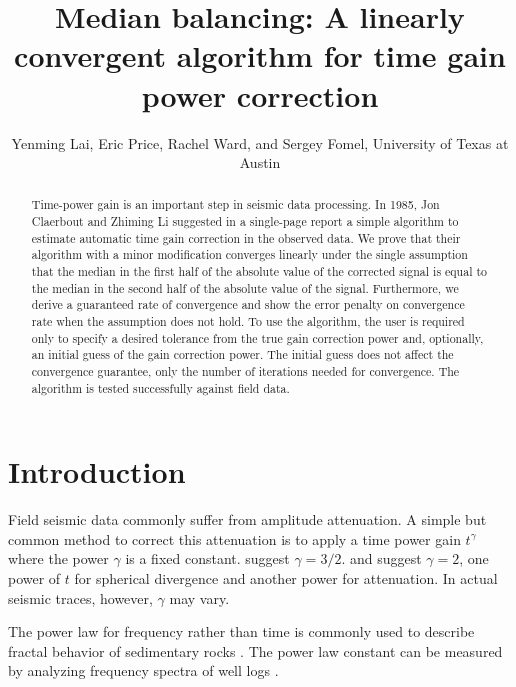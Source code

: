 \documentclass{segabs}
\begin{document}
\title{Median balancing: A linearly convergent algorithm for time gain power correction }

\renewcommand{\thefootnote}{\fnsymbol{footnote}} 

\author{Yenming Lai\footnotemark[1], Eric Price, Rachel Ward, 
  and Sergey Fomel, University of Texas at Austin}


\maketitle

\begin{abstract}
Time-power gain is an important step in seismic data processing. In 1985, Jon Claerbout and Zhiming Li suggested in a single-page report a simple algorithm to estimate automatic time gain correction in the observed data. We prove that their algorithm with a minor modification converges linearly under the single assumption that the median in the first half of the absolute value of the corrected signal is equal to the median in the second half of the absolute value of the signal. Furthermore, we derive a guaranteed rate of convergence and show the error penalty on convergence rate when the assumption does not hold.  To use the algorithm, the user is required only to specify a desired tolerance from the true gain correction power and, optionally, an initial guess of the gain correction power. The initial guess does not affect the convergence guarantee, only the number of iterations needed for convergence. The algorithm is tested successfully against field data.  
\end{abstract}

\section{Introduction}

Field seismic data commonly suffer from amplitude attenuation.  A simple but common method to correct this attenuation is to apply a time power gain $t^\gamma$ where the power $\gamma$ is a fixed constant. \cite{o1971reflections} suggest $\gamma=3/2$. \cite{Fowler.sep.38.73} and \cite{iei} suggest $\gamma=2$, one power of $t$ for spherical divergence and another power for attenuation. In actual seismic traces, however, $\gamma$ may vary. 

The power law for frequency rather than time is commonly used to describe fractal behavior of sedimentary rocks \cite[]{Walden_H85,Hewett_86,Stefani_G01,Anstey_D02a,Anstey_D02b}. The power law constant can be measured by analyzing frequency spectra of well logs \cite[]{browaeys2009fractal}.
\end{document}
